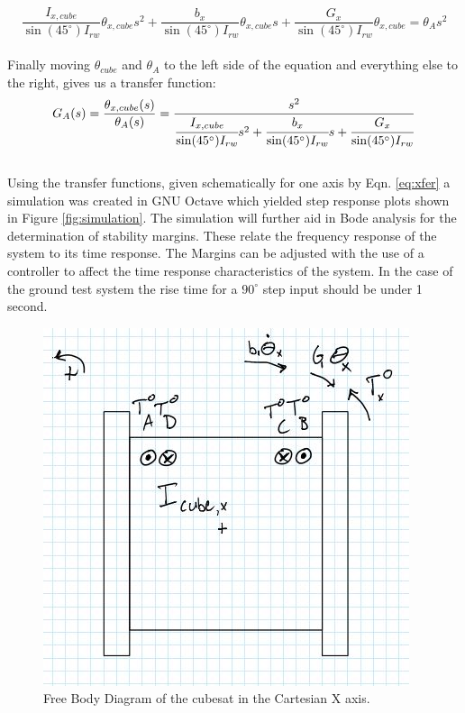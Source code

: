 \documentclass[]{aiaa-tc}%
\begin{document}
\[
\frac{I_{x,cube}}{\sin(45^{\circ}) I_{rw}} \theta_{x,cube} s^2 +
\frac{b_x}{\sin(45^{\circ}) I_{rw}} \theta_{x,cube} s +
\frac{G_x}{\sin(45^{\circ}) I_{rw}} \theta_{x,cube} = \theta_A s^2
\]\\
	
Finally moving $\theta_{cube}$ and $\theta_A$ to the left side of the equation and everything else to the right, gives us a transfer function:\\

\begin{equation}
\label{eq:xfer}
G_A(s)=\frac{\theta_{x,cube}(s)}{\theta_A(s)}=\frac{s^2}{\cfrac{I_{x,cube}}{\sin(45^{\circ}) I_{rw}}s^2 + \cfrac{b_x}{\sin(45^{\circ}) I_{rw}}s + \cfrac{G_x}{\sin(45^{\circ}) I_{rw}}}
\end{equation}\\
	
Using the transfer functions, given schematically for one axis by Eqn. \ref{eq:xfer} a simulation was created in GNU Octave which yielded step response plots shown in Figure \ref{fig:simulation}. The simulation will further aid in Bode analysis for the determination of stability margins. These relate the frequency response of the system to its time response. The Margins can be adjusted with the use of a controller to affect the time response characteristics of the system. In the case of the ground test system the rise time for a $90^{\circ}$ step input should be under 1 second. 
\begin{figure}[h!]
  \centering
  \includegraphics[width=0.35\linewidth]{Equations/Cube_FBD.JPG}
  \caption{Free Body Diagram of the cubesat in the Cartesian X axis.}
  \label{fig:FBD}
\end{figure}
\end{document}
